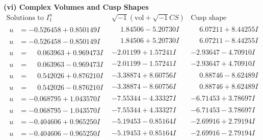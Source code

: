 \documentclass[1p]{elsarticle_modified}
\theoremstyle{definition}
\newcommand{\I}{\sqrt{-1}}
\begin{document}
\newpage\flushleft \textbf{(vi) Complex Volumes and Cusp Shapes}
$$\begin{array}{c|c|c}  
\text{Solutions to }I^u_{1}& \I (\text{vol} + \sqrt{-1}CS) & \text{Cusp shape}\\
 \hline 
\begin{aligned}
u &= -0.526458 + 0.850149 I\end{aligned}
 & \phantom{-}1.84506 - 5.20730 I & \phantom{-}6.07211 + 8.44255 I \\ \hline\begin{aligned}
u &= -0.526458 - 0.850149 I\end{aligned}
 & \phantom{-}1.84506 + 5.20730 I & \phantom{-}6.07211 - 8.44255 I \\ \hline\begin{aligned}
u &= \phantom{-}0.063963 + 0.969473 I\end{aligned}
 & -2.01199 + 1.57241 I & -2.93647 - 4.70910 I \\ \hline\begin{aligned}
u &= \phantom{-}0.063963 - 0.969473 I\end{aligned}
 & -2.01199 - 1.57241 I & -2.93647 + 4.70910 I \\ \hline\begin{aligned}
u &= \phantom{-}0.542026 + 0.876210 I\end{aligned}
 & -3.38874 + 8.60756 I & \phantom{-}0.88746 - 8.62489 I \\ \hline\begin{aligned}
u &= \phantom{-}0.542026 - 0.876210 I\end{aligned}
 & -3.38874 - 8.60756 I & \phantom{-}0.88746 + 8.62489 I \\ \hline\begin{aligned}
u &= -0.068795 + 1.043570 I\end{aligned}
 & -7.55344 - 4.33327 I & -6.71453 + 3.78697 I \\ \hline\begin{aligned}
u &= -0.068795 - 1.043570 I\end{aligned}
 & -7.55344 + 4.33327 I & -6.71453 - 3.78697 I \\ \hline\begin{aligned}
u &= -0.404606 + 0.965250 I\end{aligned}
 & -5.19453 - 0.85164 I & -2.69916 + 2.79194 I \\ \hline\begin{aligned}
u &= -0.404606 - 0.965250 I\end{aligned}
 & -5.19453 + 0.85164 I & -2.69916 - 2.79194 I \\ \hline\begin{aligned}

\end{aligned}
\end{array}$$
\end{document}
